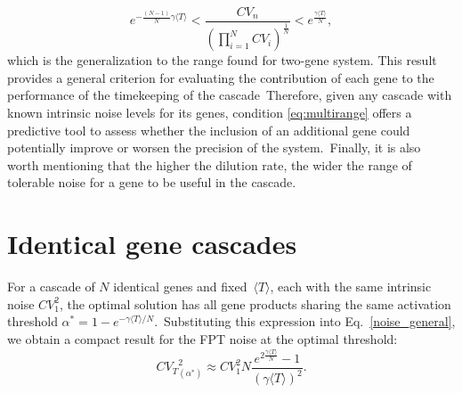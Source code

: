 \documentclass[aps,prb,reprint,superscriptaddress]{revtex4-2}
\begin{document}


\begin{equation}\label{eq:multirange}
    e^{-\frac{(N-1)}{N}\gamma\langle T\rangle} < \frac{CV_n}{\left( \prod_{i=1}^{N}CV_i\right)^{\frac{1}{N}}} < e^{\frac{\gamma\langle T\rangle}{N}},
\end{equation}
which is the generalization to the range found for two-gene system. This result provides a general criterion for evaluating the contribution of each gene to the performance of the timekeeping of the cascade~Therefore, given any cascade with known intrinsic noise levels for its genes, condition \eqref{eq:multirange} offers a predictive tool to assess whether the inclusion of an additional gene could potentially improve or worsen the precision of the system.~Finally, it is also worth mentioning that the higher the dilution rate, the wider the range of tolerable noise for a gene to be useful in the cascade.



\section{Identical gene cascades}\label{section6}

For a cascade of $N$ identical genes and  fixed~$\langle T\rangle$, each with the same intrinsic noise \(CV_1^2\), the optimal solution has all gene products sharing the same activation threshold \(\alpha^* = 1 - e^{-\gamma \langle T \rangle / N}\).~Substituting this expression into Eq.~\eqref{noise_general}, we obtain a compact result for the FPT noise at the optimal threshold:
\begin{equation}\label{noise_identico}
    {CV_T}^2_{(\alpha^*)} \approx CV_1^2N\frac{e^{2\frac{\gamma\langle T\rangle}{N}}-1}{(\gamma\langle T\rangle)^2}.
\end{equation}
\end{document}
